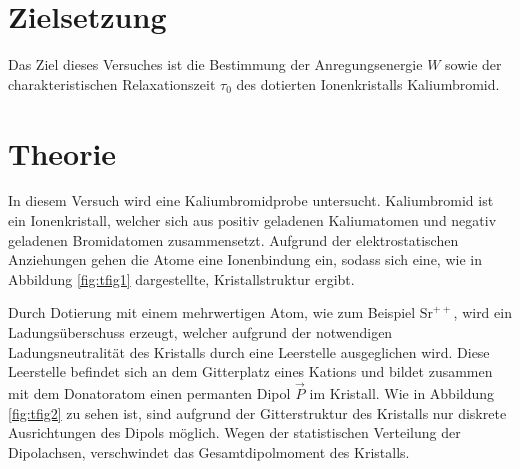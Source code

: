 \section{Zielsetzung}
Das Ziel dieses Versuches ist die Bestimmung der Anregungsenergie $W$ sowie der charakteristischen Relaxationszeit $\tau_0$ des dotierten Ionenkristalls Kaliumbromid.

\section{Theorie}
In diesem Versuch wird eine Kaliumbromidprobe untersucht.
Kaliumbromid ist ein Ionenkristall, welcher sich aus positiv geladenen Kaliumatomen und negativ geladenen Bromidatomen zusammensetzt.
Aufgrund der elektrostatischen Anziehungen gehen die Atome eine Ionenbindung ein, sodass sich eine, wie in Abbildung \ref{fig:tfig1} dargestellte, Kristallstruktur ergibt.

Durch Dotierung mit einem mehrwertigen Atom, wie zum Beispiel $\text{Sr}^{++}$, wird ein Ladungsüberschuss erzeugt, welcher aufgrund der notwendigen Ladungsneutralität des Kristalls durch eine Leerstelle ausgeglichen wird.
Diese Leerstelle befindet sich an dem Gitterplatz eines Kations und bildet zusammen mit dem Donatoratom einen permanten Dipol $\vec{P}$ im Kristall.
Wie in Abbildung \ref{fig:tfig2} zu sehen ist, sind aufgrund der Gitterstruktur des Kristalls nur diskrete Ausrichtungen des Dipols möglich.
Wegen der statistischen Verteilung der Dipolachsen, verschwindet das Gesamtdipolmoment des Kristalls.

